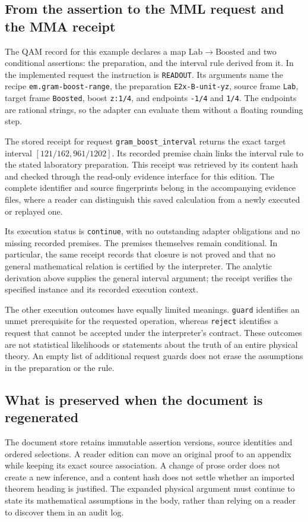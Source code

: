 \documentclass[11pt,a4paper]{article}
\begin{document}
\subsection{From the assertion to the MML request and the MMA receipt}
The QAM record for this example declares a map
$\mathrm{Lab}\to\mathrm{Boosted}$ and two conditional assertions:
the preparation, and the interval rule derived from it. In the
implemented request the instruction is \texttt{READOUT}. Its
arguments name the recipe \texttt{em.gram-boost-range}, the preparation
\texttt{E2x-B-unit-yz}, source frame \texttt{Lab}, target frame
\texttt{Boosted}, boost \texttt{z:1/4}, and endpoints
\texttt{-1/4} and \texttt{1/4}. The endpoints are rational strings,
so the adapter can evaluate them without a floating rounding step.

The stored receipt for request \texttt{gram\_boost\_interval} returns
the exact target interval $[121/162,961/1202]$. Its recorded premise
chain links the interval rule to the stated laboratory preparation.
This receipt was retrieved by its content hash and checked through
the read-only evidence interface for this edition. The complete
identifier and source fingerprints belong in the accompanying evidence
files, where a reader can distinguish this saved calculation from
a newly executed or replayed one.

Its execution status is \texttt{continue}, with no outstanding
adapter obligations and no missing recorded premises. The premises
themselves remain conditional. In particular, the same receipt records
that closure is not proved and that no general mathematical relation
is certified by the interpreter. The analytic derivation above supplies
the general interval argument; the receipt verifies the specified
instance and its recorded execution context.

The other execution outcomes have equally limited meanings.
\texttt{guard} identifies an unmet prerequisite for the requested
operation, whereas \texttt{reject} identifies a request that cannot
be accepted under the interpreter's contract. These outcomes are not
statistical likelihoods or statements about the truth of an entire
physical theory. An empty list of additional request guards does not
erase the assumptions in the preparation or the rule.

\subsection{What is preserved when the document is regenerated}
The document store retains immutable assertion versions, source
identities and ordered selections. A reader edition can move an
original proof to an appendix while keeping its exact source
association. A change of prose order does not create a new inference,
and a content hash does not settle whether an imported theorem heading
is justified. The expanded physical argument must continue to state
its mathematical assumptions in the body, rather than relying on a
reader to discover them in an audit log.
\end{document}
